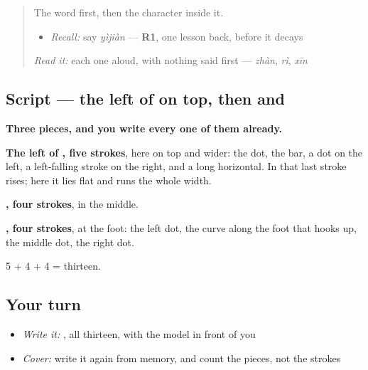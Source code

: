 \label{lesson:ZH-W280-yi}



\begin{quote}
The word first, then the character inside it.

\begin{itemize}
\raggedright
  \item \emph{Recall:} say \emph{yìjiàn} — \textbf{R1}, one lesson back, before it decays
\end{itemize}

\begin{quote}
  
\end{quote}

\emph{Read it:} each one aloud, with nothing said first — \emph{zhàn}, \emph{rì}, \emph{xīn}
\end{quote}

\subsection*{Script — the left of  on top, then  and }

\begin{quote}
\end{quote}

\textbf{Three pieces, and you write every one of them already.}

\textbf{The left of , five strokes}, here on top and wider: the dot, the bar, a dot on the left, a left-falling stroke on the right, and a long horizontal. In  that last stroke rises; here it lies flat and runs the whole width.

\textbf{, four strokes}, in the middle.

\textbf{, four strokes}, at the foot: the left dot, the curve along the foot that hooks up, the middle dot, the right dot.

5 + 4 + 4 = thirteen.

\subsection*{Your turn}
\begin{itemize}
\raggedright
  \item \emph{Write it:} , all thirteen, with the model in front of you
  \item \emph{Cover:} write it again from memory, and count the pieces, not the strokes
\end{itemize}

